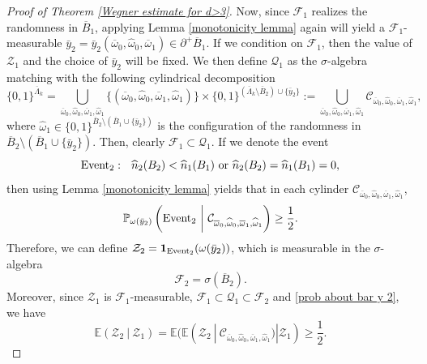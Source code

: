 \documentclass[11pt,reqno,UTF8,twoside]{amsart}
\newcommand{\E}{\mathbb{E}}
\newcommand{\event}{{\rm Event}}
\newcommand{\barLambda}{\overline{\Lambda}}
\renewcommand{\P}{\mathbb{P}}
\newcommand{\baromega}{\overline{\omega}}
\newcommand{\hatomega}{\widehat{\omega}}
\newcommand{\mcC}{\mathcal{C}}
\newcommand{\mcF}{\mathcal{F}}
\newcommand{\mcQ}{\mathcal{Q}}
\newcommand{\mcZ}{\mathcal{Z}}
\newcommand{\whn}{\widehat{n}}
\newcommand{\barB}{\overline{B}}
\theoremstyle{definition}
\numberwithin{equation}{section}
\begin{document}
\begin{proof}[Proof of Theorem \ref{Wegner estimate for d>3}]
Now, since $\mcF_1$ realizes  the randomness in $\barB_1$, applying Lemma \ref{monotonicity lemma} again will yield a $\mcF_1$-measurable $\bar{y}_2=\bar{y}_2(\baromega_0,\hatomega_0,\baromega_1)\in \partial^+ \barB_1$. If we condition on $\mcF_1$, then the value of $\mcZ_1$ and the choice of $\bar{y}_2$ will be fixed. We then define $\mcQ_1$ as the $\sigma$-algebra matching with the following cylindrical decomposition 
\[ \{0,1\}^{\barLambda_k}=\bigcup_{\baromega_0,\hatomega_0,\baromega_1,\hatomega_1} \{(\baromega_0,\hatomega_0,\baromega_1,\hatomega_1)\}\times \{0,1\}^{(\barLambda_k\setminus \barB_2)\cup \{\bar{y}_2\} } := \bigcup_{\baromega_0,\hatomega_0,\baromega_1,\hatomega_1}\mcC_{\baromega_0,\hatomega_0,\baromega_1,\hatomega_1}, \]
where $\hatomega_1\in \{0,1\}^{\barB_2\setminus (\barB_1\cup \{\bar{y}_2\})}$ is the configuration of the randomness in ${\barB_2\setminus (\barB_1\cup \{\bar{y}_2\})}$. Then, clearly $\mcF_1\subset \mcQ_1$. If we denote the event 
\begin{equation*}
   \event_2:\  \ \whn_{2}(B_{2}) <\whn_{1}(B_{1}) \ {\rm or}\ \whn_{2}(B_{2}) =\whn_{1}(B_{1})=0 ,
\end{equation*}
then using  Lemma \ref{monotonicity lemma} yields that in each cylinder $\mcC_{\baromega_0,\hatomega_0,\baromega_1,\hatomega_1}$,
\begin{equation}\label{prob about bar y 2}
   \P_{\omega(\bar{y}_2)}    \left(  \event_2 \ \bigg| \ \mcC_{\baromega_0,\hatomega_0,\baromega_1,\hatomega_1} \right)\geq \frac{1}{2}.
\end{equation}
Therefore, we can define $\mcZ_2=\mathbf{1}_{\event_2}(\omega(\bar{y}_2))$, which is measurable in the $\sigma$-algebra 
\[\mcF_2=\sigma(\barB_2).\]
Moreover, since $\mcZ_1$ is $\mcF_1$-measurable, $\mcF_1\subset \mcQ_1\subset \mcF_2$ and \eqref{prob about bar y 2}, we have 
\begin{equation}\label{expectation 1}
  \E(\mcZ_2\ | \ \mcZ_1)=\E(\E(\mcZ_2 \ | \ \mcC_{\baromega_0,\hatomega_0,\baromega_1,\hatomega_1} ) | \mcZ_1) \geq \frac{1}{2}.
\end{equation}



\end{proof}
\end{document}
